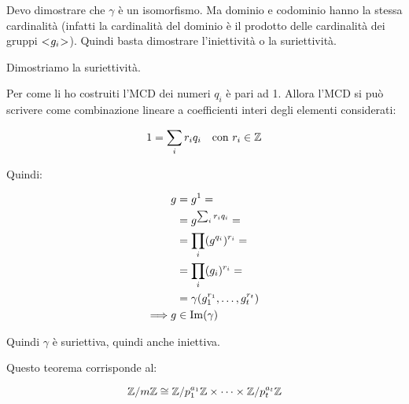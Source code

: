 \begin{dimostrazione}
	Devo dimostrare che $\gamma$ è un isomorfismo. Ma dominio e codominio hanno la stessa cardinalità (infatti la cardinalità del dominio è il prodotto delle cardinalità dei gruppi $< \negmedspace g_i \negmedspace >$). Quindi basta dimostrare l'iniettività o la suriettività.
	
	Dimostriamo la suriettività.
	
	Per come li ho costruiti l'MCD dei numeri $q_i$ è pari ad 1. Allora l'MCD si può scrivere come combinazione lineare a coefficienti interi degli elementi considerati:
	
	\begin{equation}
		1 = \sum_i r_i q_i \quad \text{con } r_i \in \mathbb{Z}
	\end{equation}

	Quindi:
	
	\begin{align}
		g &= g^1 = \\
		&= g^{\sum_i r_i q_i} = \\
		&= \prod_i(g^{q_i})^{r_i} = \\
		&= \prod_i(g_i)^{r_i} = \\
		&= \gamma(g_1^{r_1}, \dots, g_t^{r_t}) \\
		\Longrightarrow g &\in \operatorname{Im}(\gamma)
	\end{align}

	Quindi $\gamma$ è suriettiva, quindi anche iniettiva.
\end{dimostrazione}
Questo teorema corrisponde al:

\begin{teorema}
	\begin{equation}
		\mathbb{Z}/m\mathbb{Z} \cong \mathbb{Z}/p_1^{a_1}\mathbb{Z} \times \dots \times \mathbb{Z}/p_t^{a_t}\mathbb{Z}
	\end{equation}
\end{teorema}